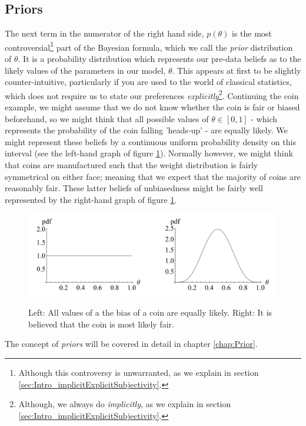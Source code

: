 \documentclass[11pt,fullpage]{book}
\begin{document}
\subsection{Priors}\label{sec:Intro_priors}
The next term in the numerator of the right hand side, $p(\theta)$ is the most controversial\footnote{Although this controversy is unwarranted, as we explain in section \ref{sec:Intro_implicitExplicitSubjectivity}.} part of the Bayesian formula, which we call the \textit{prior} distribution of $\theta$. It is a probability distribution which represents our pre-data beliefs as to the likely values of the parameters in our model, $\theta$. This appears at first to be slightly counter-intuitive, particularly if you are used to the world of classical statistics, which does not require us to state our preferences \textit{explicitly}\footnote{Although, we always do \textit{implicitly}, as we explain in section \ref{sec:Intro_implicitExplicitSubjectivity}.}. Continuing the coin example, we might assume that we do not know whether the coin is fair or biased beforehand, so we might think that all possible values of $\theta\in[0,1]$ - which represents the probability of the coin falling 'heads-up' - are equally likely. We might represent these beliefs by a continuous uniform probability density on this interval (see the left-hand graph of figure \ref{fig:Intro_priors}). Normally however, we might think that coins are manufactured such that the weight distribution is fairly symmetrical on either face; meaning that we expect that the majority of coins are reasonably fair. These latter beliefs of unbiasedness might be fairly well represented by the right-hand graph of figure \ref{fig:Intro_priors}.

\begin{figure}
\centering
\scalebox{0.6} 
{\includegraphics{Intro_priors.pdf}}
\caption{Left: All values of a the bias of a coin are equally likely. Right: It is believed that the coin is most likely fair.}\label{fig:Intro_priors}
\end{figure}

The concept of \textit{priors} will be covered in detail in chapter \ref{chap:Prior}.
\end{document}
